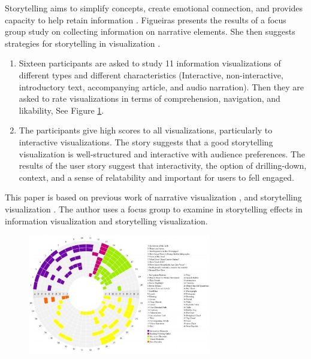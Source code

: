\documentclass{egpubl}
\begin{document}
Storytelling aims to simplify concepts, create emotional connection, and provides capacity to help retain information \cite{figueiras2014tell}.
Figueiras presents the results of a focus group study on collecting information on narrative elements. She then suggests strategies for storytelling in visualization \cite{figueiras2014tell}.
\begin{enumerate}
\item Sixteen participants are asked to study 11 information visualizations of different types and different characteristics (Interactive, non-interactive, introductory text, accompanying article, and audio narration). Then they are asked to rate visualizations in terms of  comprehension, navigation, and likability, See Figure \ref{fig:fig2014}. 
\item The participants give high scores to all visualizations, particularly to interactive visualizations. The story suggests that a good storytelling visualization is well-structured and interactive with audience preferences. The results of the user story suggest that interactivity, the option of drilling-down, context, and a sense of relatability and important for users to fell engaged.
\end{enumerate}
This paper is based on previous work of narrative visualization \cite{segal}, and storytelling visualization \cite{Kosara,sci}. The author uses a focus group to examine in storytelling effects in information visualization and storytelling visualization.
\begin{figure}
\begingroup
\centering
\includegraphics[width=8cm]{./images/fig2014}
\label{fig:fig2014}
\endgroup
\end{figure}
\end{document}
